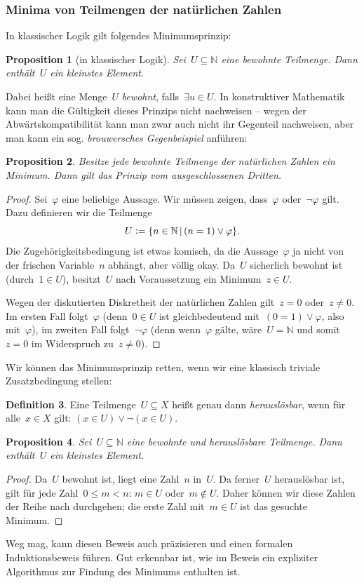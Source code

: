 \documentclass[a4paper,ngerman,12pt]{scrartcl}
\theoremstyle{definition}
\newtheorem{defn}{Definition}[section]
\theoremstyle{plain}
\newtheorem{prop}[defn]{Proposition}
\theoremstyle{remark}
\newcommand{\NN}{\mathbb{N}}
\renewcommand{\_}{\mathpunct{.}\,}
\newcommand{\?}{\,{:}\,}
\newcommand{\defeq}{\vcentcolon=}
\begin{document}
\subsubsection*{Minima von Teilmengen der natürlichen Zahlen}

In klassischer Logik gilt folgendes Minimumsprinzip:
\begin{prop}[in klassischer Logik]Sei~$U \subseteq \NN$ eine bewohnte
Teilmenge. Dann enthält~$U$ ein kleinstes Element.\end{prop}
Dabei heißt eine Menge~$U$ \emph{bewohnt}, falls~$\exists u \in U$.
In konstruktiver Mathematik kann man die Gültigkeit dieses Prinzips nicht nachweisen -- wegen der
Ab\-wärts\-kom\-pa\-ti\-bi\-li\-tät kann man zwar auch nicht ihr Gegenteil
nachweisen, aber man kann ein sog. \emph{brouwersches Gegenbeispiel}
anführen:
\begin{prop}Besitze jede bewohnte Teilmenge der natürlichen Zahlen ein Minimum.
Dann gilt das Prinzip vom ausgeschlossenen Dritten.\end{prop}
\begin{proof}Sei~$\varphi$ eine beliebige Aussage. Wir müssen zeigen,
dass~$\varphi$ oder~$\neg\varphi$ gilt. Dazu definieren wir die Teilmenge
\[ U \defeq \{ n \in \NN \,|\, (n = 1) \vee \varphi \}. \]
Die Zugehörigkeitsbedingung ist etwas komisch, da die Aussage~$\varphi$ ja
nicht von der frischen Variable~$n$ abhängt, aber völlig okay. Da~$U$
sicherlich bewohnt ist (durch~$1 \in U$), besitzt~$U$ nach Voraussetzung ein
Minimum~$z \in U$.

Wegen der diskutierten Diskretheit der natürlichen Zahlen gilt~$z = 0$ oder~$z
\neq 0$. Im ersten Fall folgt~$\varphi$ (denn~$0 \in U$ ist gleichbedeutend
mit~$(0 = 1) \vee \varphi$, also mit~$\varphi$), im zweiten Fall folgt~$\neg\varphi$ (denn
wenn~$\varphi$ gälte, wäre~$U = \NN$ und somit~$z = 0$ im Widerspruch zu~$z
\neq 0$).\end{proof}

Wir können das Minimumsprinzip retten, wenn wir eine klassisch triviale
Zusatzbedingung stellen:
\begin{defn}Eine Teilmenge~$U \subseteq X$ heißt genau dann
\emph{herauslösbar}, wenn für alle~$x \in X$ gilt: $(x \in U) \vee \neg(x \in
U)$.\end{defn}
\begin{prop}Sei~$U \subseteq \NN$ eine bewohnte und herauslösbare Teilmenge.
Dann enthält~$U$ ein kleinstes Element.\end{prop}
\begin{proof}Da~$U$ bewohnt ist, liegt eine Zahl~$n$ in~$U$. Da ferner~$U$
herauslösbar ist, gilt für jede Zahl~$0 \leq m < n$: $m \in U$ oder~$m \not\in
U$. Daher können wir diese Zahlen der Reihe nach durchgehen; die erste Zahl
mit~$m \in U$ ist das gesuchte Minimum.
\end{proof}
Weg mag, kann diesen Beweis auch präzisieren und einen formalen
Induktionsbeweis führen. Gut erkennbar ist, wie im Beweis ein expliziter
Algorithmus zur Findung des Minimums enthalten ist.
\end{document}
